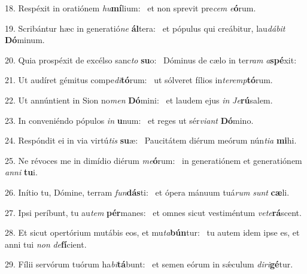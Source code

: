 18. Respéxit in oratiónem \textit{hu}\textbf{mí}lium: \ast\  et non sprevit pre\textit{cem} \textit{e}\textbf{ó}rum.\

19. Scribántur hæc in generatió\textit{ne} \textbf{ál}tera: \ast\  et pópulus qui creábitur, lau\textit{dá}\textit{bit} \textbf{Dó}minum.\

20. Quia prospéxit de excélso sanc\textit{to} \textbf{su}o: \ast\  Dóminus de cælo in ter\textit{ram} \textit{a}\textbf{spé}xit:\

21. Ut audíret gémitus compe\textit{di}\textbf{tó}rum: \ast\  ut sólveret fílios in\textit{ter}\textit{emp}\textbf{tó}rum.\

22. Ut annúntient in Sion no\textit{men} \textbf{Dó}mini: \ast\  et laudem ejus \textit{in} \textit{Je}\textbf{rú}salem.\

23. In conveniéndo pópulos \textit{in} \textbf{u}num: \ast\  et reges ut sér\textit{vi}\textit{ant} \textbf{Dó}mino.\

24. Respóndit ei in via virtú\textit{tis} \textbf{su}æ: \ast\  Paucitátem diérum meórum nún\textit{ti}\textit{a} \textbf{mi}hi.\

25. Ne révoces me in dimídio diérum \textit{me}\textbf{ó}rum: \ast\  in generatiónem et generatiónem \textit{an}\textit{ni} \textbf{tu}i.\

26. Inítio tu, Dómine, terram \textit{fun}\textbf{dás}ti: \ast\  et ópera mánuum tuá\textit{rum} \textit{sunt} \textbf{cæ}li.\

27. Ipsi períbunt, tu au\textit{tem} \textbf{pér}manes: \ast\  et omnes sicut vestiméntum \textit{ve}\textit{te}\textbf{rá}scent.\

28. Et sicut opertórium mutábis eos, et mu\textit{ta}\textbf{bún}tur: \ast\  tu autem idem ipse es, et anni tui \textit{non} \textit{de}\textbf{fí}cient.\

29. Fílii servórum tuórum ha\textit{bi}\textbf{tá}bunt: \ast\  et semen eórum in sǽculum \textit{di}\textit{ri}\textbf{gé}tur.\

